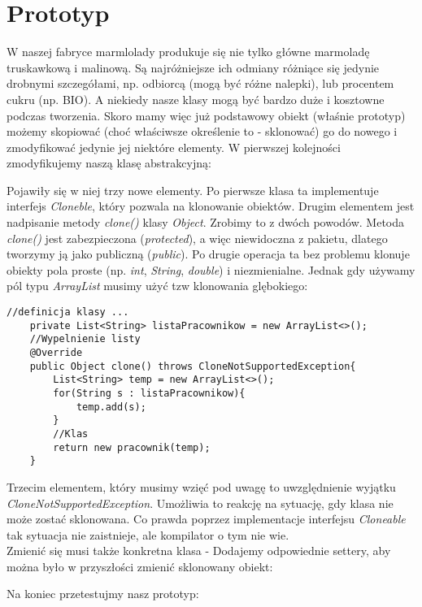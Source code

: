 \documentclass[12pt,a4paper]{article}
\begin{document}
	\section{Prototyp}
	W naszej fabryce marmlolady produkuje się nie tylko główne marmoladę truskawkową i malinową. Są najróżniejsze ich odmiany różniące się jedynie drobnymi szczegółami, np. odbiorcą (mogą być różne nalepki), lub procentem cukru (np. BIO). A niekiedy nasze klasy mogą być bardzo duże i kosztowne podczas tworzenia. Skoro mamy więc już podstawowy obiekt (właśnie prototyp) możemy skopiować (choć właściwsze określenie to - sklonować) go do nowego i zmodyfikować jedynie jej niektóre elementy. W pierwszej kolejności zmodyfikujemy naszą klasę abstrakcyjną:
	
	Pojawiły się w niej trzy nowe elementy. Po pierwsze klasa ta implementuje interfejs \textit{Cloneble}, który pozwala na klonowanie obiektów. Drugim elementem jest nadpisanie metody \textit{clone()} klasy \textit{Object}. Zrobimy to z dwóch powodów. Metoda \textit{clone()} jest zabezpieczona (\textit{protected}), a więc niewidoczna z pakietu, dlatego tworzymy ją jako publiczną (\textit{public}). Po drugie operacja ta bez problemu klonuje obiekty pola proste (np. \textit{int}, \textit{String}, \textit{double}) i niezmienialne. Jednak gdy używamy pól typu \textit{ArrayList} musimy użyć tzw klonowania glębokiego:
	\begin{lstlisting}[title=Prcawnicy.java]
	//definicja klasy ...
	private List<String> listaPracownikow = new ArrayList<>();
	//Wypelnienie listy
	@Override
	public Object clone() throws CloneNotSupportedException{
		List<String> temp = new ArrayList<>();
		for(String s : listaPracownikow){
			temp.add(s);
		}
		//Klas
		return new pracownik(temp);
	}
	\end{lstlisting}
	Trzecim elementem, który musimy wzięć pod uwagę to uwzględnienie wyjątku \textit{CloneNotSupportedException}. Umożliwia to reakcję na sytuację, gdy klasa nie może zostać sklonowana. Co prawda poprzez implementacje interfejsu \textit{Cloneable} tak sytuacja nie zaistnieje, ale kompilator o tym nie wie.\\
	Zmienić się musi także konkretna klasa - Dodajemy odpowiednie settery, aby można było w przyszłości zmienić sklonowany obiekt:
	
	Na koniec przetestujmy nasz prototyp:
	
\end{document}
